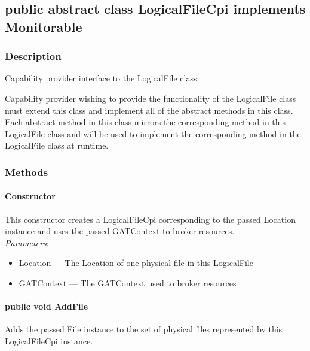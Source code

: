 \documentclass[$Date: 2003/06/26 19:29:31 $]{glabarticle}
\begin{document}
\newpage

\subsection{public abstract class LogicalFileCpi implements Monitorable}


\subsubsection{Description}

Capability provider interface to the LogicalFile class.

Capability provider wishing to provide the functionality of the LogicalFile class must extend this class and
implement all of the abstract methods in this class. Each abstract method in this class mirrors the
corresponding method in this LogicalFile class and will be used to implement the corresponding method in
the LogicalFile class at runtime. 


\subsubsection{Methods}

\paragraph{Constructor}

This constructor creates a LogicalFileCpi corresponding to the passed
Location instance and uses the passed GATContext to broker
resources. \\

\textit{Parameters}:
\begin{itemize}
\item[] Location --- The Location of one physical file in this LogicalFile
\item[] GATContext --- The GATContext used to broker resources
\end{itemize}

\paragraph{public void AddFile}

Adds the passed File instance to the set of physical files represented
by this LogicalFileCpi instance.\\
\end{document}

